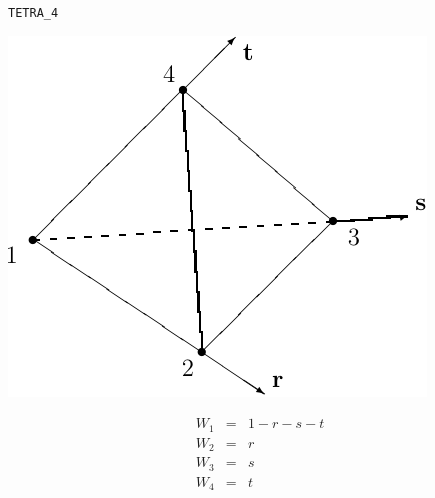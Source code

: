 \vspace{\baselineskip}
\texttt{TETRA\_4}\\[-2\baselineskip]
\begin{center}
\begin{minipage}[t]{0.5\linewidth}
   \centering
   \vspace{0pt}
   \includegraphics{cnct.figs/cnct_unst_tetra4}
\end{minipage}%
\begin{minipage}[t]{0.5\linewidth}
   \vspace{-\abovedisplayskip}
   \begin{eqnarray*}
      W_1 &=& 1-r-s-t \\
      W_2 &=& r \\
      W_3 &=& s \\
      W_4 &=& t
   \end{eqnarray*}
\end{minipage}
\end{center}

